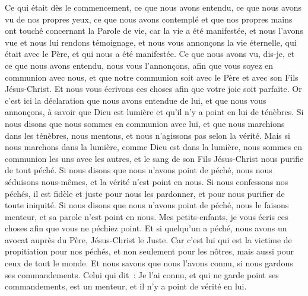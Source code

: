 \begin{multicols}{2}
\VerseOne{}Ce qui était dès le commencement, ce que nous avons entendu, ce que nous avons vu de nos propres yeux, ce que nous avons contemplé et que nos propres mains ont touché concernant la Parole de vie,
car la vie a été manifestée, et nous l'avons vue et nous lui rendons témoignage, et nous vous annonçons la vie éternelle, qui était avec le Père, et qui nous a été manifestée.
Ce que nous avons vu, dis-je, et ce que nous avons entendu, nous vous l'annonçons, afin que vous soyez en communion avec nous, et que notre communion soit avec le Père et avec son Fils Jésus-Christ.
Et nous vous écrivons ces choses afin que votre joie soit parfaite.
Or c'est ici la déclaration que nous avons entendue de lui, et que nous vous annonçons, à savoir que Dieu est lumière et qu'il n'y a point en lui de ténèbres.
Si nous disons que nous sommes en communion avec lui, et que nous marchions dans les ténèbres, nous mentons, et nous n'agissons pas selon la vérité.
Mais si nous marchons dans la lumière, comme Dieu est dans la lumière, nous sommes en communion les uns avec les autres, et le sang de son Fils Jésus-Christ nous purifie de tout péché.
Si nous disons que nous n'avons point de péché, nous nous séduisons nous-mêmes, et la vérité n'est point en nous.
Si nous confessons nos péchés, il est fidèle et juste pour nous les pardonner, et pour nous purifier de toute iniquité.
Si nous disons que nous n'avons point de péché, nous le faisons menteur, et sa parole n'est point en nous.
\VerseOne{}Mes petits-enfants, je vous écris ces choses afin que vous ne péchiez point. Et si quelqu'un a péché, nous avons un avocat auprès du Père, Jésus-Christ le Juste.
Car c'est lui qui est la victime de propitiation pour nos péchés, et non seulement pour les nôtres, mais aussi pour ceux de tout le monde.
Et nous savons que nous l'avons connu, si nous gardons ses commandements.
Celui qui dit~: Je l'ai connu, et qui ne garde point ses commandements, est un menteur, et il n'y a point de vérité en lui.

\end{multicols}
